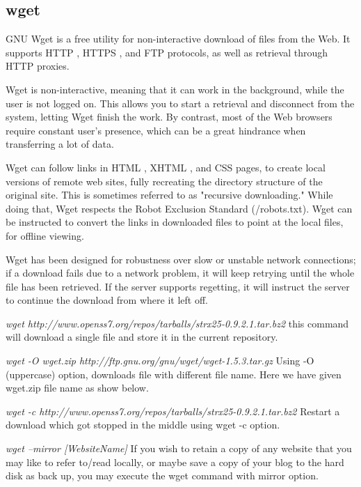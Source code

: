 \documentclass{article}
\begin{document}
\subsection{wget}


GNU Wget is a free utility for non-interactive download of files from the Web. It supports HTTP , HTTPS , and FTP protocols, as well as retrieval through HTTP proxies.

Wget is non-interactive, meaning that it can work in the background, while the user is not logged on. This allows you to start a retrieval and disconnect from the system, letting Wget finish the work. By contrast, most of the Web browsers require constant user's presence, which can be a great hindrance when transferring a lot of data.

Wget can follow links in HTML , XHTML , and CSS pages, to create local versions of remote web sites, fully recreating the directory structure of the original site. This is sometimes referred to as "recursive downloading." While doing that, Wget respects the Robot Exclusion Standard (/robots.txt). Wget can be instructed to convert the links in downloaded files to point at the local files, for offline viewing.

Wget has been designed for robustness over slow or unstable network connections; if a download fails due to a network problem, it will keep retrying until the whole file has been retrieved. If the server supports regetting, it will instruct the server to continue the download from where it left off.

\hspace{10mm} \textit{wget http://www.openss7.org/repos/tarballs/strx25-0.9.2.1.tar.bz2} this command will download a single file and store it in the current repository.

\hspace{10mm} \textit{wget -O wget.zip http://ftp.gnu.org/gnu/wget/wget-1.5.3.tar.gz} Using -O (uppercase) option, downloads file with different file name. Here we have given wget.zip file name as show below.

\hspace{10mm} \textit {wget -c http://www.openss7.org/repos/tarballs/strx25-0.9.2.1.tar.bz2} Restart a download which got stopped in the middle using wget -c option.

\hspace{10mm} \textit{wget --mirror [WebsiteName]} If you wish to retain a copy of any website that you may like to refer to/read locally, or maybe save a copy of your blog to the hard disk as back up, you may execute the wget command with mirror option.
\end{document}
